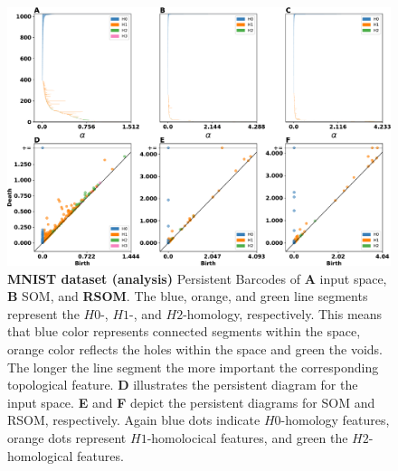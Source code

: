 \begin{figure}
  \centering
  \includegraphics[width=\textwidth]{experiment-MNIST-analysis.pdf}
  \caption{{\bfseries \sffamily MNIST dataset (analysis)}
  Persistent Barcodes of \textbf{A} input space, \textbf{B} SOM, and \textbf{RSOM}.
  The blue, orange, and green line segments represent the $H0$-, $H1$-, and $H2$-homology,
  respectively. This means
  that blue color represents connected segments within the space, orange color reflects the holes
  within the space and green the voids. The longer the line segment the more important the 
  corresponding topological feature. \textbf{D} illustrates the persistent diagram for the input space.
  \textbf{E} and \textbf{F} depict the persistent diagrams for SOM and RSOM, respectively. Again blue dots
  indicate $H0$-homology features, orange dots represent $H1$-homolocical features, and green the 
  $H2$-homological features.}
  \label{fig:MNIST:analysis}
\end{figure}